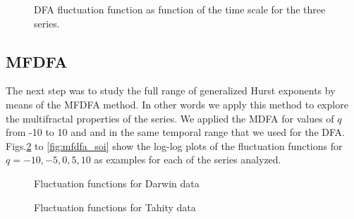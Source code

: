 \documentclass[onecolumn, preprint,aps,amsmath, amssymb, superscriptaddress]{revtex4}
\begin{document}
\begin{figure}
\caption{DFA fluctuation function as function of the time scale for the three series.}
\label{fig:dfa}
\end{figure}

\subsection{MFDFA}
\label{results_mfdfa}

The next step was to study the full range of generalized Hurst exponents by means of the MFDFA method. In other words we apply this method to explore the multifractal properties of the series. We applied the MDFA for values of $q$ from -10 to 10 and and in the same temporal range that we used for the DFA. Figs.\ref{fig:mfdfa_dar} to \ref{fig:mfdfa_soi} show the log-log plots of the fluctuation functions for $q=-10,-5,0,5,10$ as examples for each of the series analyzed.

\begin{figure}
\caption{Fluctuation functions for Darwin data}
\label{fig:mfdfa_dar}
\end{figure}

\begin{figure}
\caption{Fluctuation functions for Tahity data}
\label{fig:mfdfa_tah}
\end{figure}
\end{document}
